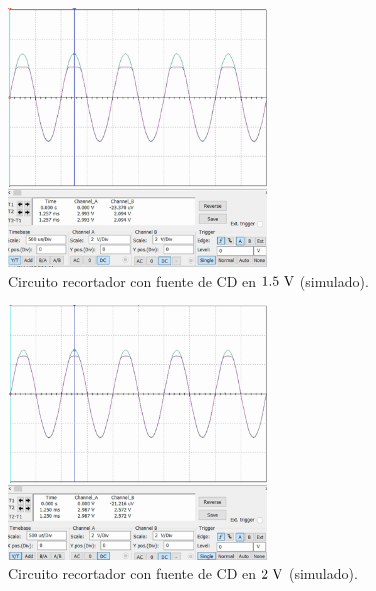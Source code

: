 \documentclass[journal]{IEEEtran}
\begin{document}
\begin{figure}[H]
        \centering
        \includegraphics[width=2.7in]{SignalSimulated_08.png}
        \caption{Circuito recortador con fuente de CD en $1.5~\textnormal{V}$ (simulado).}
        \label{fig:SignalSimulated_08}
\end{figure}

\begin{figure}[H]
        \centering
        \includegraphics[width=2.7in]{SignalSimulated_09.png}
        \caption{Circuito recortador con fuente de CD en $2~\textnormal{V}$ (simulado).}
        \label{fig:SignalSimulated_09}
\end{figure}
\end{document}
